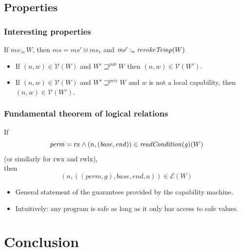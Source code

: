 \documentclass{beamer}
\newcommand{\var}[1]{\mathit{#1}}
\newcommand{\hs}{\var{ms}}
\newcommand{\gl}{\var{g}}
\newcommand{\addr}{\var{a}}
\newcommand{\start}{\var{base}}
\newcommand{\addrend}{\var{end}}
\newcommand{\heap}{\var{mem}}
\newcommand{\perm}{\var{perm}}
\newcommand{\plainfun}[2]{
  \ifthenelse{\equal{#2}{}}
  {\mathit{#1}}
  {\mathit{#1}(#2)}
}
\newcommand{\readCond}[1]{\plainfun{readCondition}{#1}}
\newcommand{\revokeTemp}[1]{\plainfun{revokeTemp}{#1}}
\newcommand{\futurewk}{\mathbin{\sqsupseteq}^{\var{pub}}}
\newcommand{\futurestr}{\mathbin{\sqsupseteq}^{\var{priv}}}
\newcommand{\heapSat}[3][\heap]{#1 :_{#2} #3}
\newcommand{\asmType}{\plaindom{AsmType}}
\newcommand{\plaindom}[1]{\mathrm{#1}}
\newcommand{\intr}[2]{\mathcal{#1}}
\newcommand{\valueintr}[1]{\intr{V}{#1}}
\newcommand{\exprintr}[1]{\intr{E}{#1}}
\newcommand{\stdvr}{\valueintr{\asmType}}
\newcommand{\stder}{\exprintr{\asmType}}
\newcommand{\npair}[2][n]{\left(#1,#2 \right)}
\newcommand{\plainperm}[1]{\mathrm{#1}}
\newcommand{\exec}{\plainperm{rx}}
\newcommand{\rwx}{\plainperm{rwx}}
\newcommand{\rwlx}{\plainperm{rwlx}}
\begin{document}
\subsection{Properties}
\begin{frame}
  \frametitle{Interesting properties}
  
  \begin{lemma}
    If $\heapSat[\hs]{n}{W}$, then $\hs = \hs' \uplus \hs_r$ and
    $\heapSat[\hs']{n}{\revokeTemp{W}}$
  \end{lemma}
  \pause
  \begin{lemma}
    \begin{itemize}
    \item If $\npair{w} \in \stdvr(W)$ and $W' \futurewk W$ then $\npair{w} \in
      \stdvr(W')$.
    \item If $\npair{w} \in \stdvr(W)$ and $W' \futurestr W$ and $w$ is
      not a local capability, then $\npair{w} \in \stdvr(W')$.
    \end{itemize}
  \end{lemma}
\end{frame}

\begin{frame}
  \frametitle{Fundamental theorem of logical relations}
  \begin{theorem}[FTLR]
    If \[
      \perm = \exec \land \npair{(\start,\addrend)} \in \readCond{}(\gl)(W)
    \]
    (or similarly for $\rwx$ and $\rwlx$),\\
    then
    \[
      \npair{((\perm,\gl),\start,\addrend,\addr)} \in \stder(W)
    \]
  \end{theorem}
  \begin{itemize}
  \item General statement of the guarantees provided by the capability machine.
  \item Intuitively: any program is safe as long as it only has access to safe values.
  \end{itemize}
\end{frame}

\section{Conclusion}
\end{document}
